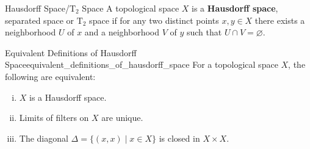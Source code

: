 \documentclass{report}
\begin{document}
\begin{definition}{Hausdorff Space/$\mathrm{T}_2$ Space}{}
	A topological space $X$ is a \textbf{Hausdorff space}, separated space or $\mathrm{T}_2$ space if for any two distinct points $x,y\in X$ there exists a neighborhood $U$ of $x$ and a neighborhood $V$ of $y$ such that $U\cap V=\varnothing$.
\end{definition}

\begin{proposition}{Equivalent Definitions of Hausdorff Space}{equivalent_definitions_of_hausdorff_space}
	For a topological space $X$, the following are equivalent:
	\begin{enumerate}[(i)]
		\item $X$ is a Hausdorff space.
		\item Limits of filters on $X$ are unique.
		\item The diagonal $\Delta=\{(x,x)\mid x\in X\}$ is closed in $X\times X$.
	\end{enumerate}
\end{proposition}
\end{document}
